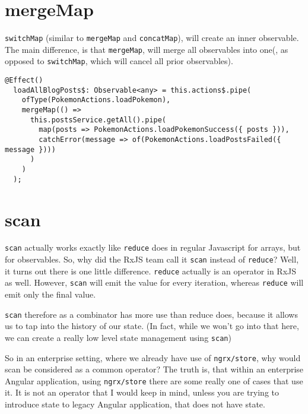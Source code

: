 \section{mergeMap}
\lstinline{switchMap} (similar to \lstinline{mergeMap} and \lstinline{concatMap}),
will create an inner observable. The main difference, is that \lstinline{mergeMap},
will merge all observables into one(, as opposed to \lstinline{switchMap}, 
which will cancel all prior observables). 

\begin{lstlisting}[caption=mergeMap example]
  @Effect()
  loadAllBlogPosts$: Observable<any> = this.actions$.pipe(
    ofType(PokemonActions.loadPokemon),
    mergeMap(() =>
      this.postsService.getAll().pipe(
        map(posts => PokemonActions.loadPokemonSuccess({ posts })),
        catchError(message => of(PokemonActions.loadPostsFailed({ message })))
      )
    )
  );  
\end{lstlisting}

\section{scan}
\lstinline{scan} actually works exactly like \lstinline{reduce} does in 
regular Javascript for arrays, but for observables. So, why did the RxJS team 
call it \lstinline{scan} instead of \lstinline{reduce}? Well, it turns out there 
is one little difference. \lstinline{reduce} actually is an operator in RxJS as
well. However, \lstinline{scan} will emit the value for every iteration, whereas 
\lstinline{reduce} will emit only the final value. 

\lstinline{scan} therefore as a combinator has more use than reduce does, 
because it allows us to tap into the history of our state. (In fact, while we
won't go into that here, we can create a really low level state management 
using \lstinline{scan})

So in an enterprise setting, where we already have use of 
\lstinline{ngrx/store}, why would scan be considered as a common operator? The 
truth is, that within an enterprise Angular application, using \lstinline{ngrx/store}
there are some really one of cases that use it. It is not an operator that I would keep 
in mind, unless you are trying to introduce state to legacy Angular application, 
that does not have state. 

